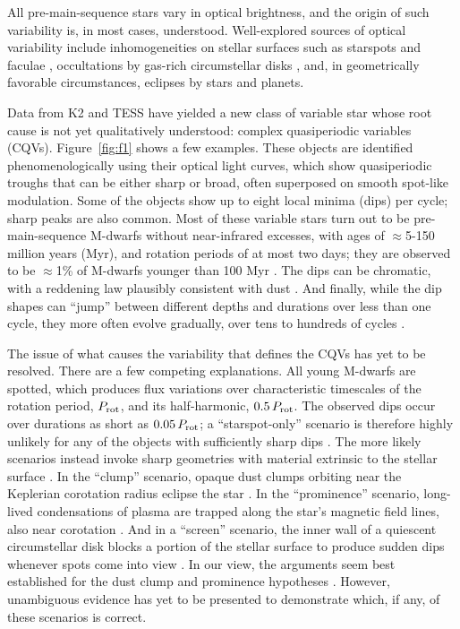 \documentclass[11pt,twocolumn,tighten]{aastex63}
\begin{document}
All pre-main-sequence stars vary in optical brightness, and the origin
of such variability is, in most cases, understood.  Well-explored
sources of optical variability include inhomogeneities on stellar
surfaces such as starspots and faculae \citep{2021isma.book.....B},
occultations by gas-rich circumstellar disks
\citep{2017MNRAS.470..202B}, and, in geometrically favorable
circumstances, eclipses by stars and planets.

Data from K2 and TESS have yielded a new class of variable star whose
root cause is not yet qualitatively understood: complex quasiperiodic
variables (CQVs).  Figure~\ref{fig:f1} shows a few examples.  These objects are identified phenomenologically
using their optical light curves, which show quasiperiodic troughs
that can be either sharp or broad, often superposed on smooth
spot-like modulation.  Some of the objects show up to eight local
minima (dips) per cycle; sharp peaks are also common.  Most of these
variable stars turn out to be pre-main-sequence M-dwarfs without
near-infrared excesses, with ages of $\approx$5-150 million years
(Myr), and rotation periods of at most two days; they are observed to
be $\approx$1\% of M-dwarfs younger than 100 Myr
\citep{2016AJ....152..114R,2017AJ....153..152S,2018AJ....155...63S,2019ApJ...876..127Z,2022AJ....163..144G}.
The dips can be chromatic, with a reddening law plausibly consistent
with dust
\citep{2020AJ....160...86B,2022AJ....163..144G,2023MNRAS.518.2921K}.
And finally, while the dip shapes can ``jump'' between different
depths and durations over less than one cycle, they more often evolve
gradually, over tens to hundreds of cycles
\citep[e.g.][]{2017AJ....153..152S,2022ApJ...925...75P,2023ApJ...945..114P}.

The issue of what causes the variability that defines the CQVs has yet
to be resolved.  There are a few competing explanations.  All young
M-dwarfs are spotted, which produces flux variations over
characteristic timescales of the rotation period, $P_{\rm rot}$, and
its half-harmonic, $0.5\,P_{\rm rot}$.  The observed dips occur over
durations as short as $0.05\,P_{\rm rot}$; a ``starspot-only''
scenario is therefore highly unlikely for any of the objects with
sufficiently sharp dips
\citep{2017AJ....153..152S,2021MNRAS.500.1366K}.   The more likely
scenarios instead invoke sharp geometries with material extrinsic to
the stellar surface
\citep[e.g.][]{2017AJ....153..152S,2022AJ....163..144G}.  In the
``clump'' scenario, opaque dust clumps orbiting near the Keplerian
corotation radius eclipse the star
\citep{2017AJ....153..152S,2023MNRAS.518.4734S}.  In the
``prominence'' scenario, long-lived condensations of plasma are
trapped along the star’s magnetic field lines, also near corotation
\citep{2022MNRAS.514.5465W}.  And in a ``screen'' scenario, the inner
wall of a quiescent circumstellar disk blocks a portion of the stellar
surface to produce sudden dips whenever spots come into view
\citep{2019ApJ...876..127Z}.  In our view, the arguments seem best
established for the dust clump and prominence hypotheses
\citep{2023MNRAS.518.4734S,2022MNRAS.514.5465W}.  However, unambiguous
evidence has yet to be presented to demonstrate which, if any, of
these scenarios is correct.
\end{document}
